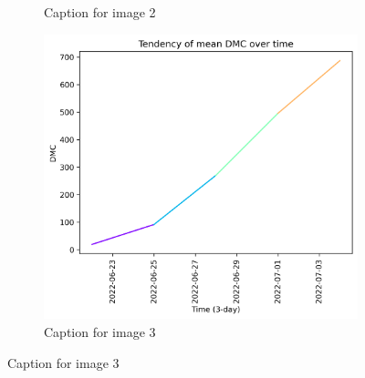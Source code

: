 \begin{figure}[h]
\begin{subfigure}{0.3\textwidth}
        \caption{Caption for image 2}
        \label{fig:img2}
    \end{subfigure}
    \hfill
    \begin{subfigure}{0.3\textwidth}
        \centering
        \includegraphics[width=\textwidth]{graphs/2022/tendency/2022_tendency_graph_DMC.png}
        \caption{Caption for image 3}
        \label{fig:img3}
    \end{subfigure}
    
    \label{fig:all_images}
\end{figure}

